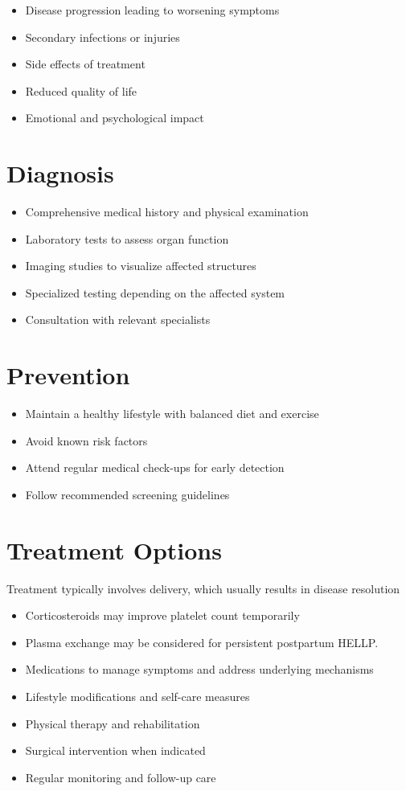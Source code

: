 \begin{itemize}[noitemsep]
  \item Disease progression leading to worsening symptoms
  \item Secondary infections or injuries
  \item Side effects of treatment
  \item Reduced quality of life
  \item Emotional and psychological impact
\end{itemize}
\section{Diagnosis}
\begin{itemize}[noitemsep]
  \item Comprehensive medical history and physical examination
  \item Laboratory tests to assess organ function
  \item Imaging studies to visualize affected structures
  \item Specialized testing depending on the affected system
  \item Consultation with relevant specialists
\end{itemize}
\section{Prevention}
\begin{itemize}[noitemsep]
  \item Maintain a healthy lifestyle with balanced diet and exercise
  \item Avoid known risk factors
  \item Attend regular medical check-ups for early detection
  \item Follow recommended screening guidelines
\end{itemize}
\section{Treatment Options}
Treatment typically involves delivery, which usually results in disease resolution

\begin{itemize}[noitemsep]
  \item Corticosteroids may improve platelet count temporarily
  \item Plasma exchange may be considered for persistent postpartum HELLP.
  \item Medications to manage symptoms and address underlying mechanisms
  \item Lifestyle modifications and self-care measures
  \item Physical therapy and rehabilitation
  \item Surgical intervention when indicated
  \item Regular monitoring and follow-up care
\end{itemize}
